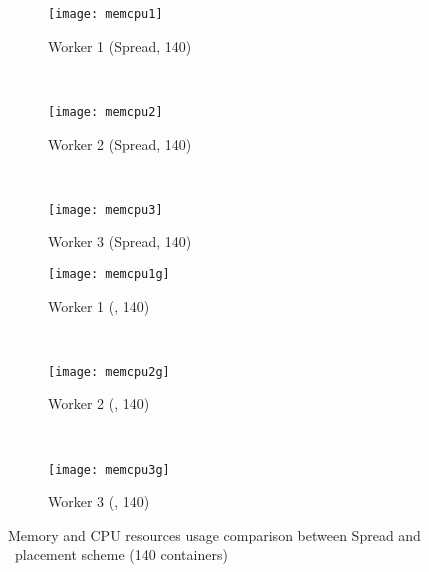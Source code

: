 \begin{figure*}[ht]
   \centering
      \begin{subfigure}[t]{0.32\linewidth}
\centering
      \texttt{[image: memcpu1]}
      \vspace{-0.15in}
      \caption{Worker 1 (Spread, 140)}
      \label{fig:worker1}
      \end{subfigure} %
      ~%
      \begin{subfigure}[t]{0.32\linewidth}
\centering
      \texttt{[image: memcpu2]}
      \vspace{-0.15in}
      \caption{Worker 2 (Spread, 140)}
      \label{fig:worker2}
      \end{subfigure} %
      ~
      \begin{subfigure}[t]{0.32\linewidth}
\centering
      \texttt{[image: memcpu3]}
      \vspace{-0.15in}
      \caption{Worker 3 (Spread, 140)}
      \label{fig:worker3}
      \end{subfigure} %
      
   \centering
      \begin{subfigure}[t]{0.32\linewidth}
\centering
      \texttt{[image: memcpu1g]}
      \vspace{-0.15in}
      \caption{Worker 1 (\sol, 140)}
      \label{fig:worker1g}
      \end{subfigure} %
      ~%
      \begin{subfigure}[t]{0.32\linewidth}
\centering
      \texttt{[image: memcpu2g]}
      \vspace{-0.15in}
      \caption{Worker 2 (\sol, 140)}
      \label{fig:worker2g}
      \end{subfigure} %
      ~
      \begin{subfigure}[t]{0.32\linewidth}
\centering
      \texttt{[image: memcpu3g]}
      \vspace{-0.15in}
      \caption{Worker 3 (\sol, 140)}
      \label{fig:worker3g}
      \end{subfigure} %
      
\caption{Memory and CPU resources usage comparison between Spread and \sol~placement scheme (140 containers)}
\label{fig:noworkload35}
\end{figure*}



